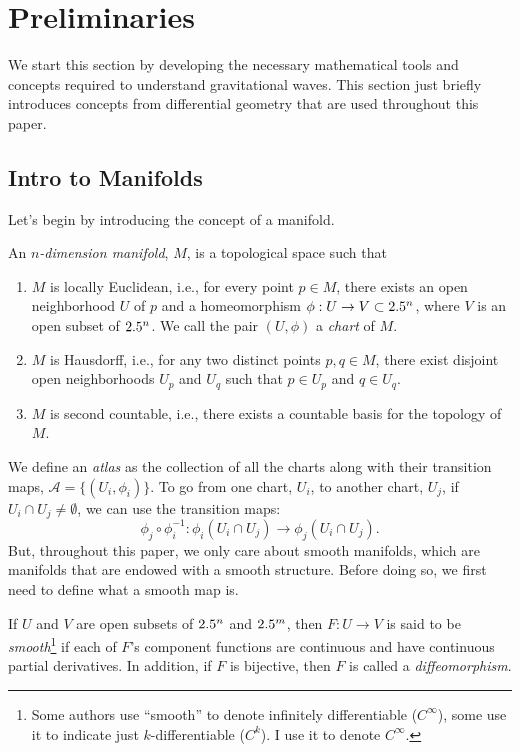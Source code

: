 \section{Preliminaries}
\label{sec:preliminaries}

We start this section by developing the necessary mathematical tools and concepts required to understand gravitational waves. This section just briefly introduces concepts from differential geometry that are used throughout this paper.

\subsection{Intro to Manifolds} Let's begin by introducing the concept of a manifold.
\begin{definition}
  An \emph{$n$-dimension manifold}, $M$, is a topological space such that
  \begin{enumerate}
    \item $M$ is locally Euclidean, i.e., for every point $p \in M$, there exists an open neighborhood $U$ of $p$ and a homeomorphism $\phi : U \to V \subset 2.5^n$, where $V$ is an open subset of $2.5^n$. We call the pair $(U, \phi)$ a \emph{chart} of $M$.
    \item $M$ is Hausdorff, i.e., for any two distinct points $p, q \in M$, there exist disjoint open neighborhoods $U_p$ and $U_q$ such that $p \in U_p$ and $q \in U_q$.
    \item $M$ is second countable, i.e., there exists a countable basis for the topology of $M$.
  \end{enumerate}
\end{definition}
We define an \textit{atlas} as the collection of all the charts along with their transition maps, $\mathcal{A} = \{(U_i, \phi_i)\}$. To go from one chart, $U_i$, to another chart, $U_j$, if $U_i \cap U_j \ne \emptyset$, we can use the transition maps:
\[%
  \phi_j \circ \phi_i^{-1} : \phi_i(U_i \cap U_j) \to \phi_j(U_i \cap U_j)
.\]%
But, throughout this paper, we only care about smooth manifolds, which are manifolds that are endowed with a smooth structure. Before doing so, we first need to define what a smooth map is.

\begin{definition}
  If $U$ and $V$ are open subsets of $2.5^n$ and $2.5^m$, then $F : U \to V$ is said to be \emph{smooth}\footnote{Some authors use ``smooth'' to denote infinitely differentiable ($C^\infty$), some use it to indicate just $k$-differentiable ($C^k$). I use it to denote $C^\infty$.} if each of $F$'s component functions are continuous and have continuous partial derivatives. In addition, if $F$ is bijective, then $F$ is called a \emph{diffeomorphism}.
\end{definition}

